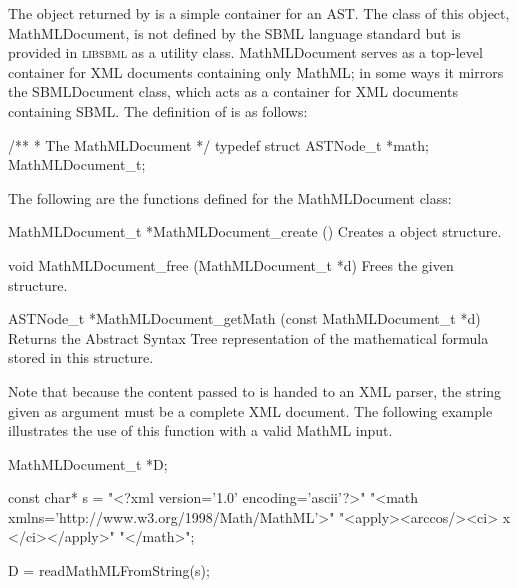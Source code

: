 \documentclass{sbmlmanual}
\newcommand{\libsbml}{\textsc{libsbml}}
\begin{document}
The object returned by  is a simple
container for an AST.  The class of this object, MathMLDocument, is not
defined by the SBML language standard but is provided in \libsbml{} as a
utility class.  MathMLDocument serves as a top-level container for XML
documents containing only MathML; in some ways it mirrors the SBMLDocument
class, which acts as a container for XML documents containing SBML.  The
definition of  is as follows:
 
\begin{example}[c]
/**
 * The MathMLDocument
 */
typedef struct
{
  ASTNode_t *math;
} MathMLDocument_t;
\end{example}  

The following are the functions defined for the MathMLDocument class:

\begin{methoddef}{MathMLDocument\_t *MathMLDocument\_create ()}
  Creates a  object structure.
\end{methoddef}

\begin{methoddef}{void MathMLDocument\_free (MathMLDocument\_t *d)}
  Frees the given  structure.
\end{methoddef}

\begin{methoddef}{ASTNode\_t *MathMLDocument\_getMath (const MathMLDocument\_t *d)}
  Returns the Abstract Syntax Tree representation of the mathematical
  formula stored in this  structure.
\end{methoddef}

Note that because the content passed to  is
handed to an XML parser, the string given as argument must be a complete
XML document.  The following example illustrates the use of this function
with a valid MathML input.

\begin{example}[c]
MathMLDocument_t *D;

const char* s = "<?xml version='1.0' encoding='ascii'?>"
                  "<math xmlns='http://www.w3.org/1998/Math/MathML'>"
                  "<apply><arccos/><ci> x </ci></apply>"
                  "</math>";

D = readMathMLFromString(s);
\end{example}


\end{document}
